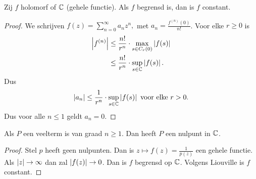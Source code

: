 \begin{stelling}
	Zij $f$ holomorf of $\mathbb{C}$ (gehele functie). Als $f$ begrensd is, dan is $f$ constant.
\end{stelling}
\begin{proof}
	We schrijven $f(z) = \sum_{n = 0}^{\infty}a_nz^{n},$ met $a_n = \frac{f^{(n)}(0)}{n!}$.
	Voor elke $r \ge 0 $ is 
	\begin{align*}
		\left| f^{(n)} \right| &\le \frac{n!}{r^{n}} \cdot  \max_{s \in C_r(0)} \left| f(s) \right| \\
			      &\le \frac{n!}{r^{n}} \cdot \sup_{s \in \mathbb{C}}\left| f(s) \right|
	.\end{align*}
	Dus 
	\[
		\left| a_n \right| \le \frac{1}{r^{n}}\cdot \sup_{s \in \mathbb{C}} \left| f(s) \right| \text{ voor elke } r > 0
	.\] 
	Dus voor alle $n\le 1$ geldt $a_n = 0$.
\end{proof}
\begin{stelling}
Als $P$ een veelterm is van graad $n \ge 1$. Dan heeft  $P$ een nulpunt in $\mathbb{C}$.
\end{stelling}
\begin{proof}
	Stel $p$ heeft geen nulpunten. Dan is $z\mapsto f(z) = \frac{1}{p(z)}$ een gehele functie. Als $\left| z \right| \to \infty$ dan zal $\left| f(z) \right| \to 0$.
	Dan is $f$ begrensd op $\mathbb{C}$.
	Volgens Liouville is $f$ constant. \contra
\end{proof}


